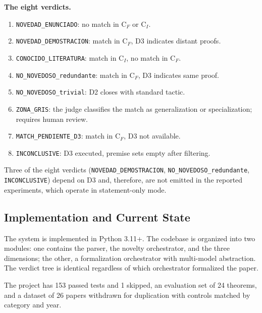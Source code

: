 \textbf{The eight verdicts.}

\begin{enumerate}
\item \texttt{NOVEDAD\_ENUNCIADO}: no match in C$_F$ or C$_I$.
\item \texttt{NOVEDAD\_DEMOSTRACION}: match in C$_F$, D3 indicates distant proofs.
\item \texttt{CONOCIDO\_LITERATURA}: match in C$_I$, no match in C$_F$.
\item \texttt{NO\_NOVEDOSO\_redundante}: match in C$_F$, D3 indicates same proof.
\item \texttt{NO\_NOVEDOSO\_trivial}: D2 closes with standard tactic.
\item \texttt{ZONA\_GRIS}: the judge classifies the match as generalization or specialization; requires human review.
\item \texttt{MATCH\_PENDIENTE\_D3}: match in C$_F$, D3 not available.
\item \texttt{INCONCLUSIVE}: D3 executed, premise sets empty after filtering.
\end{enumerate}

Three of the eight verdicts (\texttt{NOVEDAD\_DEMOSTRACION}, \texttt{NO\_NOVEDOSO\_redundante}, \texttt{INCONCLUSIVE}) depend on D3 and, therefore, are not emitted in the reported experiments, which operate in statement-only mode.

\subsection{Implementation and Current State}

The system is implemented in Python 3.11+. The codebase is organized into two modules: one contains the parser, the novelty orchestrator, and the three dimensions; the other, a formalization orchestrator with multi-model abstraction. The verdict tree is identical regardless of which orchestrator formalized the paper.

The project has 153 passed tests and 1 skipped, an evaluation set of 24 theorems, and a dataset of 26 papers withdrawn for duplication with controls matched by category and year.